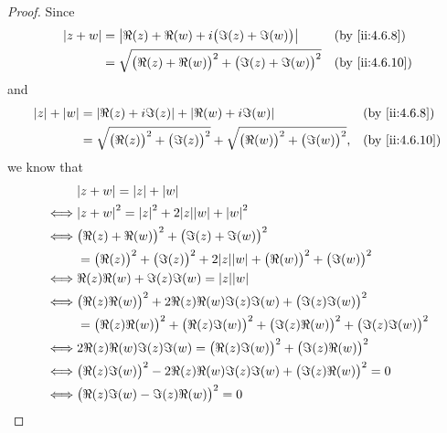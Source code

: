 \begin{proof}
  Since
  \begin{align*}
    \abs{z + w} & = \abs{\Re(z) + \Re(w) + i \big(\Im(z) + \Im(w)\big)}              &  & \by{ii:4.6.8}  \\
                & = \sqrt{\big(\Re(z) + \Re(w)\big)^2 + \big(\Im(z) + \Im(w)\big)^2} &  & \by{ii:4.6.10}
  \end{align*}
  and
  \begin{align*}
    \abs{z} + \abs{w} & = \abs{\Re(z) + i \Im(z)} + \abs{\Re(w) + i \Im(w)}                                                &  & \by{ii:4.6.8}  \\
                      & = \sqrt{\big(\Re(z)\big)^2 + \big(\Im(z)\big)^2} + \sqrt{\big(\Re(w)\big)^2 + \big(\Im(w)\big)^2}, &  & \by{ii:4.6.10}
  \end{align*}
  we know that
  \begin{align*}
         & \abs{z + w} = \abs{z} + \abs{w}                                                                                 \\
    \iff & \abs{z + w}^2 = \abs{z}^2 + 2 \abs{z} \abs{w} + \abs{w}^2                                                       \\
    \iff & \big(\Re(z) + \Re(w)\big)^2 + \big(\Im(z) + \Im(w)\big)^2                                                       \\
         & = \big(\Re(z)\big)^2 + \big(\Im(z)\big)^2 + 2 \abs{z} \abs{w} + \big(\Re(w)\big)^2 + \big(\Im(w)\big)^2         \\
    \iff & \Re(z) \Re(w) + \Im(z) \Im(w) = \abs{z} \abs{w}                                                                 \\
    \iff & \big(\Re(z) \Re(w)\big)^2 + 2 \Re(z) \Re(w) \Im(z) \Im(w) + \big(\Im(z) \Im(w)\big)^2                           \\
         & = \big(\Re(z) \Re(w)\big)^2 + \big(\Re(z) \Im(w)\big)^2 + \big(\Im(z) \Re(w)\big)^2 + \big(\Im(z) \Im(w)\big)^2 \\
    \iff & 2 \Re(z) \Re(w) \Im(z) \Im(w) = \big(\Re(z) \Im(w)\big)^2 + \big(\Im(z) \Re(w)\big)^2                           \\
    \iff & \big(\Re(z) \Im(w)\big)^2 - 2 \Re(z) \Re(w) \Im(z) \Im(w) + \big(\Im(z) \Re(w)\big)^2 = 0                       \\
    \iff & \big(\Re(z) \Im(w) - \Im(z) \Re(w)\big)^2 = 0                                                                   \\

\end{align*}
\end{proof}
